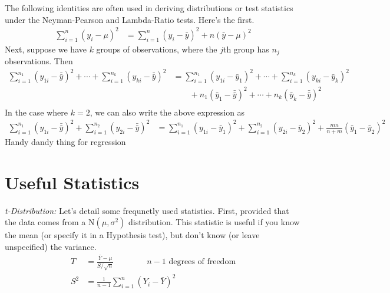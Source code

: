 \documentclass[a4paper,12pt]{scrartcl}
\begin{document}
The following identities are often used in deriving distributions
or test statistics under the Neyman-Pearson and Lambda-Ratio tests.
Here's the first.
\begin{align*}
   \sum^n_{i=1} (y_i - \mu)^2 &= \sum^n_{i=1} (y_i - \bar{y})^2
      + n(\bar{y}-\mu)^2
\end{align*}
Next, suppose we have $k$ groups of observations, where the $j$th
group has $n_j$ observations. Then
\begin{align*}
   \sum^{n_1}_{i=1} (y_{1i}-\bar{\bar{y}})^2 + \cdots +
   \sum^{n_k}_{i=1} (y_{ki}-\bar{\bar{y}})^2 &=
   \sum^{n_1}_{i=1} (y_{1i}-\bar{y}_1)^2 + \cdots +
   \sum^{n_k}_{i=1} (y_{ki}-\bar{y}_k)^2 \\
   &\qquad + n_1(\bar{y}_1 - \bar{\bar{y}})^2+ \cdots +
   n_k(\bar{y}_k - \bar{\bar{y}})^2\\
\end{align*}
In the case where $k=2$, we can also write the above expression as
\begin{align*}
   \sum^{n_1}_{i=1} (y_{1i}-\bar{\bar{y}})^2 +
   \sum^{n_2}_{i=1} (y_{2i}-\bar{\bar{y}})^2 &=
   \sum^{n_1}_{i=1} (y_{1i}-\bar{y}_1)^2 +
   \sum^{n_2}_{i=1} (y_{2i}-\bar{y}_2)^2
      + \frac{nm}{n+m}(\bar{y}_1 -\bar{y}_2)^2
\end{align*}
Handy dandy thing for regression





\section{Useful Statistics}

{\sl t-Distribution:}
Let's detail some frequnetly used statistics. First, provided that the
data comes from a N$(\mu,\sigma^2)$ distribution. This statistic
is useful if you know the mean (or specify it in a Hypothesis test),
but don't know (or leave unspecified) the variance.
\begin{align*}
   T &= \frac{\bar{Y} -\mu}{S/\sqrt{n}} \qquad \qquad
      \text{$n-1$ degrees of freedom}\\
   S^2 &= \frac{1}{n-1}\sum^n_{i=1} (Y_i - \bar{Y})^2
\end{align*}
\end{document}
